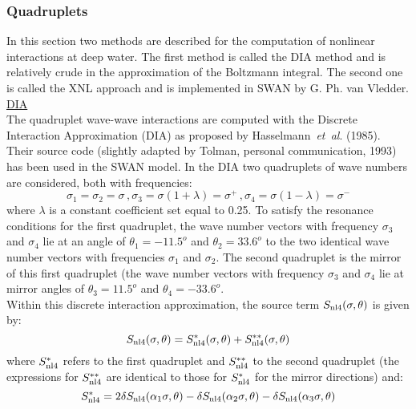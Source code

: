 \documentclass[12pt]{book}
\begin{document}
\subsubsection{Quadruplets} \label{sec:quad}
In this section two methods are described for the computation of nonlinear interactions at deep water.
The first method is called the DIA method and is relatively crude in the approximation of the Boltzmann
integral. The second one is called the XNL approach and is implemented in SWAN by G. Ph. van Vledder.
\\[2ex]
\noindent
\underline{DIA}\\[2ex]
The quadruplet wave-wave interactions are computed with the Discrete Interaction Approximation (DIA)
as proposed by Hasselmann~{\it et~al}. (1985). Their source code (slightly adapted by Tolman, personal
communication, 1993) has been used in the SWAN model. In the DIA two quadruplets of wave numbers are
considered, both with frequencies:
\begin{equation}
  \sigma_1 = \sigma_2 = \sigma\, , \sigma_3 = \sigma (1+\lambda) = \sigma^+ \, ,
  \sigma_4 = \sigma (1 - \lambda) = \sigma^{-}
  \label{eq3-27}
\end{equation}
where $\lambda$ is a constant coefficient set equal to 0.25. To satisfy the resonance conditions for the first
quadruplet, the wave number vectors with frequency $\sigma_3$ and $\sigma_4$ lie at an angle of $\theta_1 = -11.5^o$
and $\theta_2 = 33.6^o$ to the two identical wave number vectors with frequencies $\sigma_1$ and $\sigma_2$.
The second quadruplet is the mirror of this first quadruplet (the wave number vectors with frequency
$\sigma_3$ and $\sigma_4$ lie at mirror angles of $\theta_3 = 11.5^o$ and $\theta_4 = -33.6^o$.
\\[2ex]
\noindent
Within this discrete interaction approximation, the source term $S_{\rm nl4}(\sigma,\theta)$ is given by:
\begin{equation}
  S_{\rm nl4} (\sigma,\theta) = S^*_{\rm nl4} (\sigma,\theta) + S^{**}_{\rm nl4} (\sigma,\theta)
  \label{eq3-28}
\end{equation}
where $S_{\rm nl4}^{*}$ refers to the first quadruplet and $S_{\rm nl4}^{**}$ to the second quadruplet
(the expressions for $S_{\rm nl4}^{**}$ are identical to those for $S_{\rm nl4}^{*}$ for the mirror directions) and:
\begin{equation}
  S^*_{\rm nl4} = 2\delta S_{\rm nl4} (\alpha_1\sigma,\theta) - \delta S_{\rm nl4} (\alpha_2\sigma,\theta)
             - \delta S_{\rm nl4} (\alpha_3\sigma,\theta)
  \label{eq3-29}
\end{equation}
\end{document}
